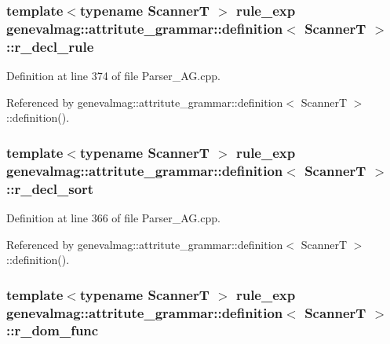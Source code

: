 \hypertarget{structgenevalmag_1_1attritute__grammar_1_1definition_a926ac8cc5506dbfff6bf5e61fe99a67e}{
\subsubsection[{r\_\-decl\_\-rule}]{\setlength{\rightskip}{0pt plus 5cm}template$<$typename ScannerT $>$ {\bf rule\_\-exp} {\bf genevalmag::attritute\_\-grammar::definition}$<$ ScannerT $>$::{\bf r\_\-decl\_\-rule}}}
\label{structgenevalmag_1_1attritute__grammar_1_1definition_a926ac8cc5506dbfff6bf5e61fe99a67e}


Definition at line 374 of file Parser\_\-AG.cpp.



Referenced by genevalmag::attritute\_\-grammar::definition$<$ ScannerT $>$::definition().

\hypertarget{structgenevalmag_1_1attritute__grammar_1_1definition_aaadce2fe2c90b72f3752865efee316a1}{
\subsubsection[{r\_\-decl\_\-sort}]{\setlength{\rightskip}{0pt plus 5cm}template$<$typename ScannerT $>$ {\bf rule\_\-exp} {\bf genevalmag::attritute\_\-grammar::definition}$<$ ScannerT $>$::{\bf r\_\-decl\_\-sort}}}
\label{structgenevalmag_1_1attritute__grammar_1_1definition_aaadce2fe2c90b72f3752865efee316a1}


Definition at line 366 of file Parser\_\-AG.cpp.



Referenced by genevalmag::attritute\_\-grammar::definition$<$ ScannerT $>$::definition().

\hypertarget{structgenevalmag_1_1attritute__grammar_1_1definition_ab5db15e112b1c264fa4d04bdaa68e758}{
\subsubsection[{r\_\-dom\_\-func}]{\setlength{\rightskip}{0pt plus 5cm}template$<$typename ScannerT $>$ {\bf rule\_\-exp} {\bf genevalmag::attritute\_\-grammar::definition}$<$ ScannerT $>$::{\bf r\_\-dom\_\-func}}}
\label{structgenevalmag_1_1attritute__grammar_1_1definition_ab5db15e112b1c264fa4d04bdaa68e758}


